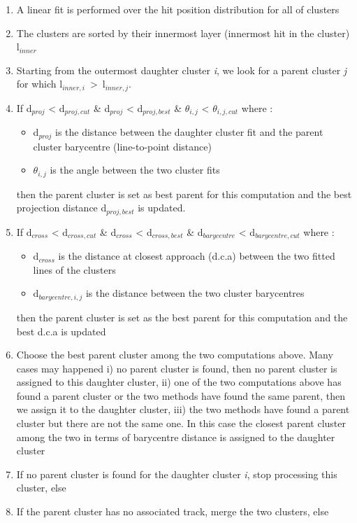 \documentclass[cits]{JINST}
\begin{document}
\begin{enumerate}
  \item A linear fit is performed over the hit position distribution for all of clusters
  \item The clusters are sorted by their innermost layer (innermost hit in the cluster) l$_{inner}$
  \item Starting from the outermost daughter cluster \textit{i}, we look for a parent cluster \textit{j} for which l$_{inner,i}$~>~l$_{inner,j}$.
  \item If d$_{proj}$ < d$_{proj,cut}$ \& d$_{proj}$ < d$_{proj,best}$ \& $\theta_{i,j}$ < $\theta_{i,j,cut}$  where :
  \begin{itemize}
    \item d$_{proj}$ is the distance between the daughter cluster fit and the parent cluster barycentre (line-to-point distance)
    \item $\theta_{i,j}$ is the angle between the two cluster fits
  \end{itemize}
  then the parent cluster is set as best parent for this computation and the best projection distance d$_{proj,best}$ is updated.
  \item If d$_{cross}$ < d$_{cross,cut}$ \& d$_{cross}$ < d$_{cross,best}$ \& d$_{barycentre}$ < d$_{barycentre,cut}$ where :
  \begin{itemize}
    \item d$_{cross}$ is the distance at closest approach (d.c.a) between the two fitted lines of the clusters
    \item d$_{barycentre,i,j}$ is the distance between the two cluster barycentres
  \end{itemize}
  then the parent cluster is set as the best parent for this computation and the best d.c.a is updated
  \item Choose the best parent cluster among the two computations above. Many cases may happened i) no parent cluster is found, then no parent cluster is assigned to this daughter cluster, ii) one of the two computations above has found a parent cluster or the two methods have found the same parent, then we assign it to the daughter cluster, iii) the two methods have found a parent cluster but there are not the same one. In this case the closest parent cluster among the two in terms of barycentre distance is assigned to the daughter cluster
  \item If no parent cluster is found for the daughter cluster \textit{i}, stop processing this cluster, else
  \item If the parent cluster has no associated track, merge the two clusters, else

\end{enumerate}
\end{document}
